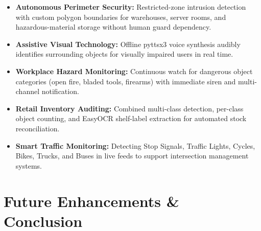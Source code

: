 \documentclass[conference]{IEEEtran}
\begin{document}
\begin{itemize}
    \item \textbf{Autonomous Perimeter Security:} Restricted-zone intrusion
          detection with custom polygon boundaries for warehouses, server rooms,
          and hazardous-material storage without human guard dependency.
    \item \textbf{Assistive Visual Technology:} Offline pyttsx3 voice synthesis
          audibly identifies surrounding objects for visually impaired users in
          real time.
    \item \textbf{Workplace Hazard Monitoring:} Continuous watch for dangerous
          object categories (open fire, bladed tools, firearms) with immediate
          siren and multi-channel notification.
    \item \textbf{Retail Inventory Auditing:} Combined multi-class detection,
          per-class object counting, and EasyOCR shelf-label extraction for
          automated stock reconciliation.
    \item \textbf{Smart Traffic Monitoring:} Detecting Stop Signals, Traffic
          Lights, Cycles, Bikes, Trucks, and Buses in live feeds to support
          intersection management systems.
\end{itemize}

\section{Future Enhancements \& Conclusion}
\end{document}
